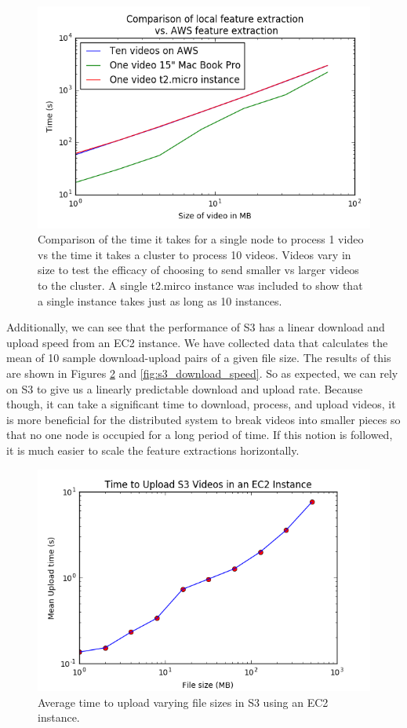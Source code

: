 \begin{figure}[h]
  \centering
  \includegraphics[width=.9\textwidth]{figures/aws_vs_local.png}
  \caption{Comparison of the time it takes for a single node to process 1 video
  vs the time it takes a cluster to process 10 videos. Videos vary in size to
  test the efficacy of choosing to send smaller vs larger videos to the cluster.
  A single t2.mirco instance was included to show that a single instance takes
  just as long as 10 instances.}
  \label{fig:size_matters}
\end{figure}

\FloatBarrier

Additionally, we can see that the performance of S3 has a linear download and upload
speed from an EC2 instance. We have collected data that calculates the mean of 10
sample download-upload pairs of a given file size. The results of this are shown
in Figures \ref{fig:s3_upload_speed} and \ref{fig:s3_download_speed}. So as expected,
we can rely on S3 to give us a linearly predictable download and upload rate.
Because though, it can take a significant time to download, process, and upload videos,
it is more beneficial for the distributed system to break videos into smaller
pieces so that no one node is occupied for a long period of time. If this
notion is followed, it is much easier to scale the feature extractions horizontally.

\begin{figure}[h]
  \centering
  \includegraphics[width=.8\textwidth]{figures/s3_upload_speed}
  \caption{Average time to upload varying file sizes in S3 using an EC2 instance. }
  \label{fig:s3_upload_speed}
\end{figure}


